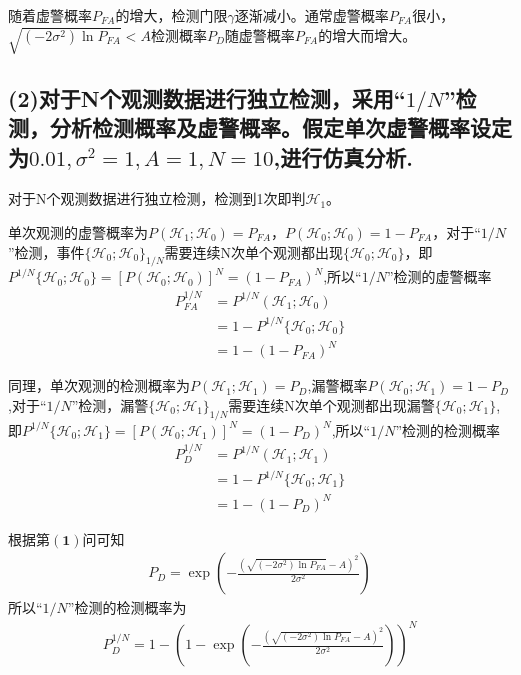 \documentclass[fontset=windows]{article}
\numberwithin{figure}{section}
\begin{document}
随着虚警概率\(P_{FA}\)的增大，检测门限\(\gamma\)逐渐减小。通常虚警概率\(P_{FA}\)很小，\(\sqrt{(-2\sigma^2)\ln P_{FA}}<A\)检测概率\(P_D\)随虚警概率\(P_{FA}\)的增大而增大。

\subsection*{(2)对于N个观测数据进行独立检测，采用“\(1/N\)”检测，分析检测概率及虚警概率。假定单次虚警概率设定为\(0.01,\sigma^2=1,A=1,N=10\),进行仿真分析.}

对于N个观测数据进行独立检测，检测到1次即判\(\mathcal{H}_1\)。

单次观测的虚警概率为\(P(\mathcal{H}_1;\mathcal{H}_0)=P_{FA}\)，\(P(\mathcal{H}_0;\mathcal{H}_0)=1-P_{FA}\)，对于“\(1/N\)”检测，事件\(\{\mathcal{H}_0;\mathcal{H}_0\}_{1/N}\)需要连续N次单个观测都出现\(\{\mathcal{H}_0;\mathcal{H}_0\}\)，即\(P^{1/N}\{\mathcal{H}_0;\mathcal{H}_0\}=[P(\mathcal{H}_0;\mathcal{H}_0)]^N=(1-P_{FA})^N\),所以“\(1/N\)”检测的虚警概率
\begin{align*}
    P^{1/N}_{FA} & =P^{1/N}(\mathcal{H}_1;\mathcal{H}_0)     \\
                 & =1-P^{1/N}\{\mathcal{H}_0;\mathcal{H}_0\} \\
                 & =1-(1-P_{FA})^N
\end{align*}

同理，单次观测的检测概率为\(P(\mathcal{H}_1;\mathcal{H}_1)=P_D\),漏警概率\(P(\mathcal{H}_0;\mathcal{H}_1)=1-P_D\),对于“\(1/N\)”检测，漏警\(\{\mathcal{H}_0;\mathcal{H}_1\}_{1/N}\)需要连续N次单个观测都出现漏警\(\{\mathcal{H}_0;\mathcal{H}_1\}\),即\(P^{1/N}\{\mathcal{H}_0;\mathcal{H}_1\}=[P(\mathcal{H}_0;\mathcal{H}_1)]^N=(1-P_D)^N\),所以“\(1/N\)”检测的检测概率
\begin{align*}
    P^{1/N}_D & =P^{1/N}(\mathcal{H}_1;\mathcal{H}_1)     \\
              & =1-P^{1/N}\{\mathcal{H}_0;\mathcal{H}_1\} \\
              & =1-(1-P_D)^N
\end{align*}

根据第\(\mathbf{(1)}\)问可知
\begin{align*}
    P_D =\exp\left(-\frac{(\sqrt{(-2\sigma^2)\ln P_{FA}}-A)^2}{2\sigma^2}\right)
\end{align*}
所以“\(1/N\)”检测的检测概率为
\begin{align*}
    P^{1/N}_D=1-\left(1-\exp\left(-\frac{(\sqrt{(-2\sigma^2)\ln P_{FA}}-A)^2}{2\sigma^2}\right)\right)^N
\end{align*}
\end{document}

